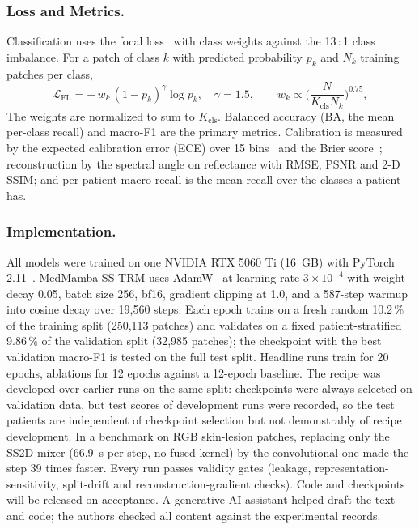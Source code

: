 \documentclass{svproc}
\begin{document}
\subsubsection{Loss and Metrics.}
Classification uses the focal loss~\cite{focal} with class weights against the 13\,:\,1 class imbalance. For a patch of class $k$ with predicted probability $p_k$ and $N_k$ training patches per class,
\begin{equation}
\mathcal{L}_{\text{FL}} = -\,w_k\,(1 - p_k)^{\gamma} \log p_k, \quad \gamma = 1.5, \qquad
w_k \propto \Big(\frac{N}{K_{\text{cls}} N_k}\Big)^{0.75},
\label{eq:focal}
\end{equation}
The weights are normalized to sum to $K_{\text{cls}}$. Balanced accuracy (BA, the mean per-class recall) and macro-F1 are the primary metrics. Calibration is measured by the expected calibration error (ECE) over 15 bins~\cite{naeini,guo2017} and the Brier score~\cite{brier}; reconstruction by the spectral angle on reflectance with RMSE, PSNR and 2-D SSIM; and per-patient macro recall is the mean recall over the classes a patient has.

\subsubsection{Implementation.}
All models were trained on one NVIDIA RTX 5060 Ti (16~GB) with PyTorch 2.11~\cite{pytorch}. MedMamba-SS-TRM uses AdamW~\cite{adamw} at learning rate $3 \times 10^{-4}$ with weight decay 0.05, batch size 256, bf16, gradient clipping at 1.0, and a 587-step warmup into cosine decay over 19,560 steps. Each epoch trains on a fresh random 10.2\,\% of the training split (250,113 patches) and validates on a fixed patient-stratified 9.86\,\% of the validation split (32,985 patches); the checkpoint with the best validation macro-F1 is tested on the full test split. Headline runs train for 20 epochs, ablations for 12 epochs against a 12-epoch baseline. The recipe was developed over earlier runs on the same split: checkpoints were always selected on validation data, but test scores of development runs were recorded, so the test patients are independent of checkpoint selection but not demonstrably of recipe development. In a benchmark on RGB skin-lesion patches, replacing only the SS2D mixer (66.9~s per step, no fused kernel) by the convolutional one made the step 39 times faster. Every run passes validity gates (leakage, representation-sensitivity, split-drift and reconstruction-gradient checks). Code and checkpoints will be released on acceptance. A generative AI assistant helped draft the text and code; the authors checked all content against the experimental records.
\end{document}
